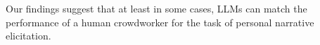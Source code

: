 
Our findings suggest that at least in some cases, LLMs can match the performance of a human crowdworker for the task of personal narrative elicitation.




